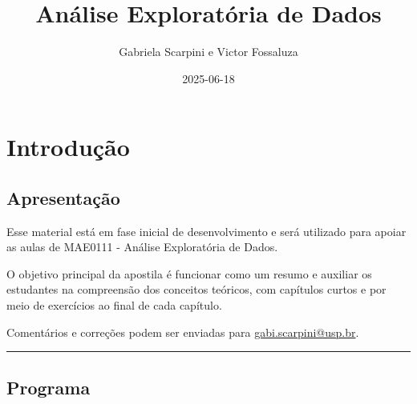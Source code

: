 \documentclass[
]{book}
\title{Análise Exploratória de Dados}
\author{Gabriela Scarpini e Victor Fossaluza}
\date{2025-06-18}
\begin{document}
\maketitle

{
\setcounter{tocdepth}{1}
\tableofcontents
}
\chapter{Introdução}\label{intro}

\section{Apresentação}\label{apresentauxe7uxe3o}

Esse material está em fase inicial de desenvolvimento e será utilizado para apoiar as aulas de MAE0111 - Análise Exploratória de Dados.

O objetivo principal da apostila é funcionar como um resumo e auxiliar os estudantes na compreensão dos conceitos teóricos, com capítulos curtos e por meio de exercícios ao final de cada capítulo.

Comentários e correções podem ser enviadas para \url{gabi.scarpini@usp.br}.

\begin{center}\rule{0.5\linewidth}{0.5pt}\end{center}

\section{Programa}\label{programa}
\end{document}
